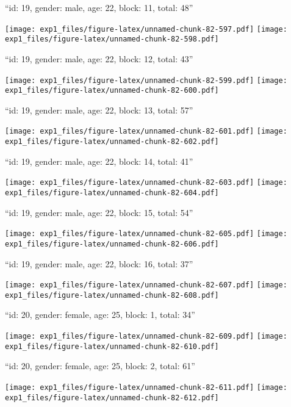 \documentclass[11pt,,]{article}
\begin{document}
\newpage
[1] 

``id: 19, gender: male, age: 22, block: 11, total: 48''

\texttt{[image: exp1\_files/figure-latex/unnamed-chunk-82-597.pdf]}
\texttt{[image: exp1\_files/figure-latex/unnamed-chunk-82-598.pdf]}

\newpage
[1] 

``id: 19, gender: male, age: 22, block: 12, total: 43''

\texttt{[image: exp1\_files/figure-latex/unnamed-chunk-82-599.pdf]}
\texttt{[image: exp1\_files/figure-latex/unnamed-chunk-82-600.pdf]}

\newpage
[1] 

``id: 19, gender: male, age: 22, block: 13, total: 57''

\texttt{[image: exp1\_files/figure-latex/unnamed-chunk-82-601.pdf]}
\texttt{[image: exp1\_files/figure-latex/unnamed-chunk-82-602.pdf]}

\newpage
[1] 

``id: 19, gender: male, age: 22, block: 14, total: 41''

\texttt{[image: exp1\_files/figure-latex/unnamed-chunk-82-603.pdf]}
\texttt{[image: exp1\_files/figure-latex/unnamed-chunk-82-604.pdf]}

\newpage
[1] 

``id: 19, gender: male, age: 22, block: 15, total: 54''

\texttt{[image: exp1\_files/figure-latex/unnamed-chunk-82-605.pdf]}
\texttt{[image: exp1\_files/figure-latex/unnamed-chunk-82-606.pdf]}

\newpage
[1] 

``id: 19, gender: male, age: 22, block: 16, total: 37''

\texttt{[image: exp1\_files/figure-latex/unnamed-chunk-82-607.pdf]}
\texttt{[image: exp1\_files/figure-latex/unnamed-chunk-82-608.pdf]}

\newpage
[1] 

``id: 20, gender: female, age: 25, block: 1, total: 34''

\texttt{[image: exp1\_files/figure-latex/unnamed-chunk-82-609.pdf]}
\texttt{[image: exp1\_files/figure-latex/unnamed-chunk-82-610.pdf]}

\newpage
[1] 

``id: 20, gender: female, age: 25, block: 2, total: 61''

\texttt{[image: exp1\_files/figure-latex/unnamed-chunk-82-611.pdf]}
\texttt{[image: exp1\_files/figure-latex/unnamed-chunk-82-612.pdf]}
\end{document}
